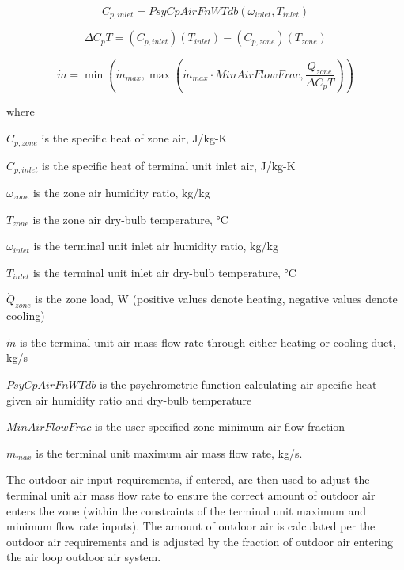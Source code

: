 \begin{equation}
C_{p,inlet} = PsyCpAirFnWTdb\left( {\omega_{inlet}},{T_{inlet}} \right)
\end{equation}

\begin{equation}
\Delta C_p T = \left( {C_{p,inlet}} \right)\left( {{T_{inlet}}} \right) - \left( {C_{p,zone}} \right)\left( {{T_{zone}}} \right)
\end{equation}

\begin{equation}
\dot m = \min \left( \dot m_{max}, \max \left( \dot m_{max}\cdot MinAirFlowFrac,\frac{\dot Q_{zone}}{\Delta C_p T} \right) \right)
\end{equation}

where

\(C_{p,zone}\) is the specific heat of zone air, J/kg-K

\(C_{p,inlet}\) is the specific heat of terminal unit inlet air, J/kg-K

\({\omega_{zone}}\) is the zone air humidity ratio, kg/kg

\({T_{zone}}\) is the zone air dry-bulb temperature, °C

\({\omega_{inlet}}\) is the terminal unit inlet air humidity ratio, kg/kg

\({T_{inlet}}\) is the terminal unit inlet air dry-bulb temperature, °C

\(\dot Q_{zone}\) is the zone load, W (positive values denote heating, negative values denote cooling)

\(\dot m\) is the terminal unit air mass flow rate through either heating or cooling duct, kg/s

\(PsyCpAirFnWTdb\) is the psychrometric function calculating air specific heat given air humidity ratio and dry-bulb temperature

\(MinAirFlowFrac\) is the user-specified zone minimum air flow fraction

\({\dot m_{max}}\) is the terminal unit maximum air mass flow rate, kg/s.

The outdoor air input requirements, if entered, are then used to adjust the terminal unit air mass flow rate to ensure the correct amount of outdoor air enters the zone (within the constraints of the terminal unit maximum and minimum flow rate inputs). The amount of outdoor air is calculated per the outdoor air requirements and is adjusted by the fraction of outdoor air entering the air loop outdoor air system.

